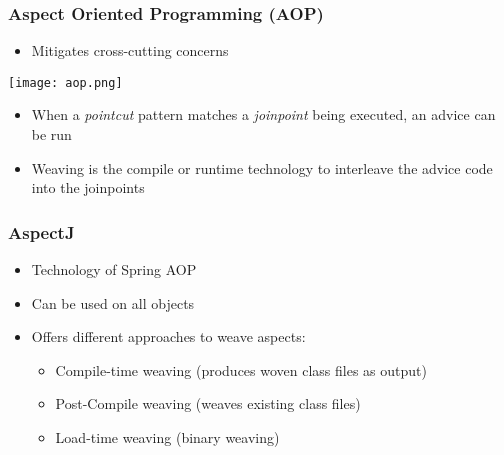 \subsubsection{Aspect Oriented Programming (AOP)}
\begin{itemize}
    \item Mitigates cross-cutting concerns
\end{itemize}
\texttt{[image: aop.png]}
\begin{itemize}
    \item When a \textit{pointcut} pattern matches a \textit{joinpoint} being executed, an advice can be run
    \item Weaving is the compile or runtime technology to interleave the advice code into the joinpoints
\end{itemize}

\subsubsection{AspectJ}
\begin{itemize}
    \item Technology of Spring AOP
    \item Can be used on all objects
    \item Offers different approaches to weave aspects:
    \begin{itemize}
        \item Compile-time weaving (produces woven class files as output)
        \item Post-Compile weaving (weaves existing class files)
        \item Load-time weaving (binary weaving)
    \end{itemize}
\end{itemize}
